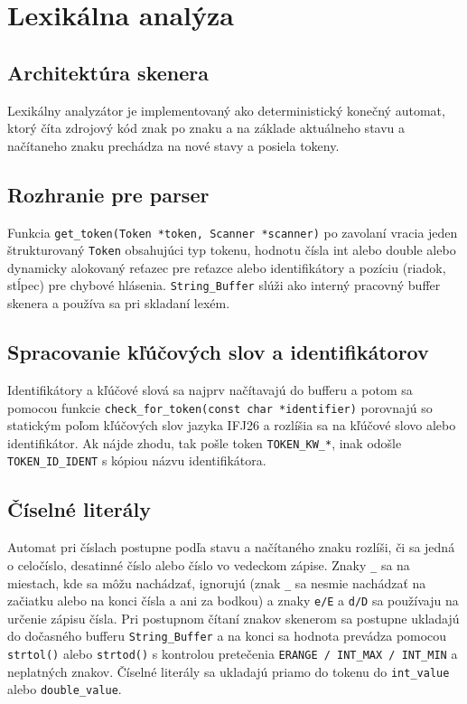 \section{Lexikálna analýza}

\subsection{Architektúra skenera}
Lexikálny analyzátor je implementovaný ako deterministický konečný automat, ktorý číta zdrojový kód znak po znaku a na základe aktuálneho stavu a načítaneho znaku prechádza na nové stavy a posiela tokeny.

\subsection{Rozhranie pre parser}
Funkcia \texttt{get\_token(Token *token, Scanner *scanner)} po zavolaní vracia jeden štrukturovaný \texttt{Token} obsahujúci typ tokenu, hodnotu čísla int alebo double alebo dynamicky alokovaný reťazec pre reťazce alebo identifikátory a pozíciu (riadok, stĺpec) pre chybové hlásenia.
\texttt{String\_Buffer} slúži ako interný pracovný buffer skenera a používa sa pri skladaní lexém. 

\subsection{Spracovanie kľúčových slov a identifikátorov}
Identifikátory a kľúčové slová sa najprv načítavajú do bufferu a potom sa pomocou funkcie \texttt{check\_for\_token(const char *identifier)} porovnajú so statickým poľom kľúčových slov jazyka IFJ26 a rozlíšia sa na kľúčové slovo alebo identifikátor.
Ak nájde zhodu, tak pošle token \texttt{TOKEN\_KW\_*}, inak odošle \texttt{TOKEN\_ID\_IDENT} s kópiou názvu identifikátora.

\subsection{Číselné literály}
Automat pri číslach postupne podľa stavu a načítaného znaku rozlíši, či sa jedná o celočíslo, desatinné číslo alebo číslo vo vedeckom zápise.
Znaky \texttt{\_} sa na miestach, kde sa môžu nachádzať, ignorujú (znak \texttt{\_} sa nesmie nachádzať na začiatku alebo na konci čísla a ani za bodkou) a znaky \texttt{e/E} a \texttt{d/D} sa používaju na určenie zápisu čísla.
Pri postupnom čítaní znakov skenerom sa postupne ukladajú do dočasného bufferu \texttt{String\_Buffer} a na konci sa hodnota prevádza pomocou \texttt{strtol()} alebo \texttt{strtod()} s kontrolou pretečenia \texttt{ERANGE / INT\_MAX / INT\_MIN} a neplatných znakov.
Číselné literály sa ukladajú priamo do tokenu do \texttt{int\_value} alebo \texttt{double\_value}.

